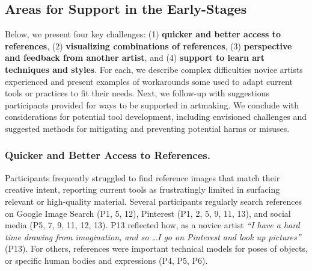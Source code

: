 



\subsection{Areas for Support in the Early-Stages} %


Below, we present four key challenges: (1) 
\textbf{quicker and better access to references}, (2) \textbf{visualizing combinations of references}, (3) \textbf{perspective and feedback from another artist}, and (4) \textbf{support to learn art techniques and styles}. For each, we describe complex difficulties novice artists experienced and present examples of workarounds some used to adapt current tools or practices to fit their needs. 
Next, we follow-up with suggestions participants provided for ways to be supported in artmaking. 
We conclude with considerations for potential tool development, including envisioned challenges and suggested methods for mitigating and preventing potential harms or misuses. 

\subsubsection{Quicker and Better Access to References.} \label{refs}
Participants frequently struggled to find reference images that match their creative intent, reporting current tools as frustratingly limited in surfacing relevant or high-quality material.
Several participants regularly search references on Google Image Search (P1, 5, 12), Pinterest (P1, 2, 5, 9, 11, 13), and social media (P5, 7, 9, 11, 12, 13). P13 reflected how, as a novice artist \textit{``I have a hard time drawing from imagination, and so \dots I go on Pinterest and look up pictures''} (P13). 
For others, references were important technical models for poses of objects, or specific human bodies and expressions (P4, P5, P6). 

